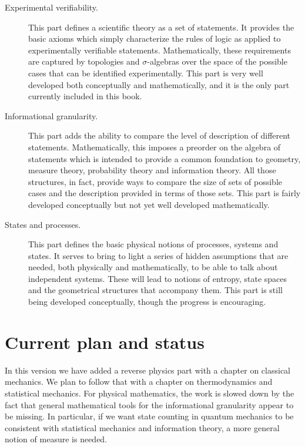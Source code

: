 \documentclass[11pt,letterpaper,fleqn]{memoir} %
\begin{document}
\begin{description}
	\item[Experimental verifiability.] This part defines a scientific theory as a set of statements. It provides the basic axioms which simply characterize the rules of logic as applied to experimentally verifiable statements. Mathematically, these requirements are captured by topologies and $\sigma$-algebras over the space of the possible cases that can be identified experimentally. This part is very well developed both conceptually and mathematically, and it is the only part currently included in this book. 
	
	\item[Informational granularity.] This part adds the ability to compare the level of description of different statements. Mathematically, this imposes a preorder on the algebra of statements which is intended to provide a common foundation to geometry, measure theory, probability theory and information theory. All those structures, in fact, provide ways to compare the size of sets of possible cases and the description provided in terms of those sets. This part is fairly developed conceptually but not yet well developed mathematically.
	
	\item[States and processes.] This part defines the basic physical notions of processes, systems and states. It serves to bring to light a series of hidden assumptions that are needed, both physically and mathematically, to be able to talk about independent systems. These will lead to notions of entropy, state spaces and the geometrical structures that accompany them. This part is still being developed conceptually, though the progress is encouraging.
\end{description}


\section*{Current plan and status}

In this version we have added a reverse physics part with a chapter on classical mechanics. We plan to follow that with a chapter on thermodynamics and statistical mechanics. For physical mathematics, the work is slowed down by the fact that general mathematical tools for the informational granularity appear to be missing. In particular, if we want state counting in quantum mechanics to be consistent with statistical mechanics and information theory, a more general notion of measure is needed.
\end{document}
